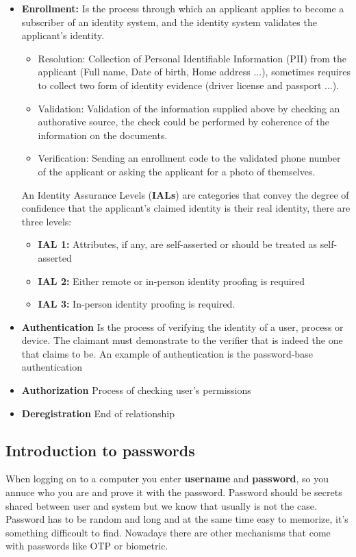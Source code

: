     \begin{itemize}
        \item \textbf{Enrollment:} Is the process through which an applicant applies to become a subscriber of an identity system, and the identity system validates the applicant's identity.
        \begin{itemize}
            \item Resolution: Collection of Personal Identifiable Information (PII) from the applicant (Full name, Date of birth, Home address ...), sometimes requires to collect two form of identity evidence (driver license and passport ...).
            \item Validation: Validation of the information supplied above by checking an authorative source, the check could be performed by coherence of the information on the documents.
            \item Verification: Sending an enrollment code to the validated phone number of the applicant or asking the applicant for a photo of themselves. 
        \end{itemize}   
        An Identity Assurance Levels (\textbf{IALs}) are categories that convey the degree of confidence that the applicant's claimed identity is their real identity, there are three levels:
        \begin{itemize}
            \item \textbf{IAL 1:} Attributes, if any, are self-asserted or should be treated as self-asserted
            \item \textbf{IAL 2:} Either remote or in-person identity proofing is required
            \item \textbf{IAL 3:} In-person identity proofing is required. 
        \end{itemize}
        \item \textbf{Authentication} Is the process of verifying the identity of a user, process or device. The claimant must demonstrate to the verifier that is indeed the one that claims to be. An example of authentication is the password-base authentication
        \item \textbf{Authorization} Process of checking user's permissions
        \item \textbf{Deregistration} End of relationship
    \end{itemize} 
    
    \subsection{Introduction to passwords}
    When logging on to a computer you enter \textbf{username} and \textbf{password}, so you annuce who you are and prove it with the password. Password should be secrets shared between user and system but we know that usually is not the case.
    Password has to be random and long and at the same time easy to memorize, it's something difficoult to find. Nowadays there are other mechanisms that come with passwords like OTP or biometric.
    
